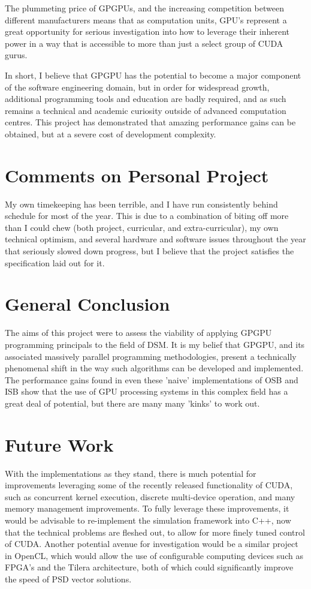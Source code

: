 The plummeting price of GPGPUs, and the increasing competition between different manufacturers means that as computation units, GPU's represent a great opportunity for serious investigation into how to leverage their inherent power in a way that is accessible to more than just a select group of CUDA gurus.

In short, I believe that GPGPU has the potential to become a major component of the software engineering domain, but in order for widespread growth, additional programming tools and education are badly required, and as such remains a technical and academic curiosity outside of advanced computation centres. This project has demonstrated that amazing performance gains can be obtained, but at a severe cost of development complexity. 

\section{Comments on Personal Project}
My own timekeeping has been terrible, and I have run consistently behind schedule for most of the year. This is due to a combination of biting off more than I could chew (both project, curricular, and extra-curricular), my own technical optimism, and several hardware and software issues throughout the year that seriously slowed down progress, but I believe that the project satisfies the specification laid out for it.

\section{General Conclusion}
The aims of this project were to assess the viability of applying GPGPU programming principals to the field of DSM. It is my belief that GPGPU, and its associated massively parallel programming methodologies, present a technically phenomenal shift in the way such algorithms can be developed and implemented. The performance gains found in even these 'naive' implementations of OSB and ISB show that the use of GPU processing systems in this complex field has a great deal of potential, but there are many many 'kinks' to work out.

\section{Future Work}
With the implementations as they stand, there is much potential for improvements leveraging some of the recently released functionality of CUDA, such as concurrent kernel execution, discrete multi-device operation, and many memory management improvements. To fully leverage these improvements, it would be advisable to re-implement the simulation framework into C++, now that the technical problems are fleshed out, to allow for more finely tuned control of CUDA. Another potential avenue for investigation would be a similar project in OpenCL, which would allow the use of configurable computing devices such as FPGA's and the Tilera architecture, both of which could significantly improve the speed of PSD vector solutions.


